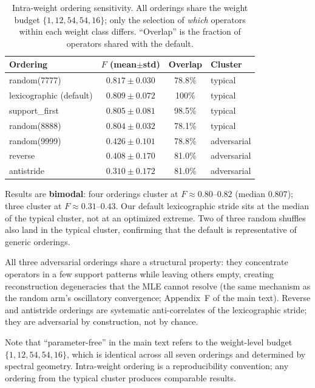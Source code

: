 \documentclass[twocolumn,prx,aps,superscriptaddress,longbibliography]{revtex4-2}
\begin{document}
\begin{table}[ht!]
\caption{Intra-weight ordering sensitivity.  All orderings share
the weight budget $\{1, 12, 54, 54, 16\}$; only the selection of
\emph{which} operators within each weight class differs.  ``Overlap''
is the fraction of operators shared with the default.}
\label{tab:ordering}
\begin{ruledtabular}
\begin{tabular}{lccl}
Ordering & $F$ (mean$\pm$std) & Overlap & Cluster \\
\hline
random(7777)              & $0.817 \pm 0.030$ & 78.8\% & typical \\
lexicographic (default)   & $0.809 \pm 0.072$ & 100\%  & typical \\
support\_first            & $0.805 \pm 0.081$ & 98.5\% & typical \\
random(8888)              & $0.804 \pm 0.032$ & 78.1\% & typical \\
\hline
random(9999)              & $0.426 \pm 0.101$ & 78.8\% & adversarial \\
reverse                   & $0.408 \pm 0.170$ & 81.0\% & adversarial \\
antistride                & $0.310 \pm 0.172$ & 81.0\% & adversarial \\
\end{tabular}
\end{ruledtabular}
\end{table}

Results are \textbf{bimodal}: four orderings cluster at
$F \approx 0.80$--$0.82$ (median $0.807$); three cluster at
$F \approx 0.31$--$0.43$.  Our default lexicographic stride sits at
the median of the typical cluster, not at an optimized extreme.
Two of three random shuffles also land in the typical cluster,
confirming that the default is representative of generic orderings.

All three adversarial orderings share a structural property: they
concentrate operators in a few support patterns while leaving others
empty, creating reconstruction degeneracies that the MLE cannot
resolve (the same mechanism as the random arm's oscillatory
convergence; Appendix~F of the main text).  Reverse and
antistride orderings are systematic anti-correlates of the
lexicographic stride; they are adversarial by construction,
not by chance.

Note that ``parameter-free'' in the main text refers to the
weight-level budget $\{1, 12, 54, 54, 16\}$, which is identical
across all seven orderings and determined by spectral geometry.
Intra-weight ordering is a reproducibility convention; any
ordering from the typical cluster produces comparable results.
\end{document}
